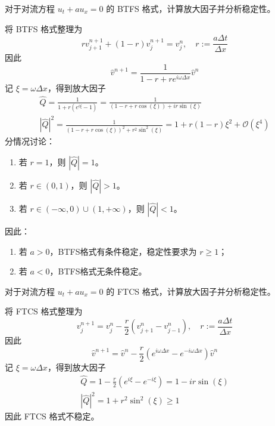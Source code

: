 \begin{example}\label{eg:btfs}
    对于对流方程 $u_t + a u_x = 0$ 的 BTFS 格式，计算放大因子并分析稳定性。
\end{example}

\begin{solution*}
    将 BTFS 格式整理为
    \[
        r v_{j+1}^{n+1} + (1-r) v_j^{n+1} = v_j^n, \quad r := \frac{a \Delta t}{\Delta x}
    \]
    因此
    \[
        \hat{v}^{n+1} = \frac{1}{1-r+r e^{i \omega \Delta x}}\hat{v}^n
    \]
    记 $\xi = \omega \Delta x$，得到放大因子
    \begin{gather*}
        \widehat{Q} ={}  \frac{1}{1 + r (e^{i \xi} - 1)} = \frac{1}{(1 - r + r \cos(\xi)) + i r \sin(\xi)}     \\
        |\widehat{Q}|^2 ={} \frac{1}{(1 - r + r \cos(\xi))^2 + r^2 \sin^2(\xi)} = 1 + r(1-r) \xi^2 + \mathcal{O}(\xi^4)
    \end{gather*}
    分情况讨论：
    \begin{enumerate}
        \item 若 $r=1$，则 $|\widehat{Q}| = 1$。
        \item 若 $r \in (0,1)$，则 $|\widehat{Q}| > 1$。
        \item 若 $r \in (-\infty,0) \cup (1,+\infty)$，则 $|\widehat{Q}| < 1$。
    \end{enumerate}
    因此：
    \begin{enumerate}
        \item 若 $a>0$，BTFS格式有条件稳定，稳定性要求为 $r \ge 1$；
        \item 若 $a<0$，BTFS格式无条件稳定。
    \end{enumerate}
\end{solution*}

\begin{example}\label{eg:ftcs}
    对于对流方程 $u_t + a u_x = 0$ 的 FTCS 格式，计算放大因子并分析稳定性。
\end{example}

\begin{solution*}
    将 FTCS 格式整理为
    \[
        v_j^{n+1} = v_j^n - \frac{r}2 \left( v_{j+1}^n - v_{j-1}^n \right), \quad r := \frac{a \Delta t}{\Delta x}
    \]
    因此
    \[
        \hat{v}^{n+1} = \hat{v}^n - \frac{r}2 (e^{i \omega \Delta x} - e^{-i \omega \Delta x}) \hat{v}^n
    \]
    记 $\xi = \omega \Delta x$，得到放大因子
    \begin{gather*}
        \widehat{Q} ={}  1 - \frac{r}2 (e^{i \xi} - e^{-i \xi}) = 1 -  i r \sin(\xi)            \\
        |\widehat{Q}|^2 ={} 1 + r^2 \sin^2(\xi) \ge 1
    \end{gather*}
    因此 FTCS 格式不稳定。
\end{solution*}

